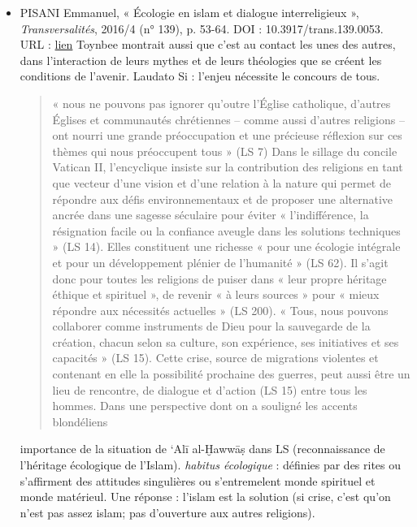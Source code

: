 \begin{itemize}
    \item PISANI Emmanuel, « Écologie en islam et dialogue interreligieux », \textit{Transversalités}, 2016/4 (n° 139), p. 53-64. DOI : 10.3917/trans.139.0053. URL : \href{https://www-cairn-info.icp.idm.oclc.org/revue-transversalites-2016-4-page-53.htm }{lien}
    Toynbee montrait aussi que c’est au contact les unes des autres, dans l’interaction de leurs mythes et de leurs théologies que se créent les conditions de l’avenir.
    Laudato Si : l'enjeu nécessite le concours de tous.
    \begin{quote}
        « nous ne pouvons pas ignorer qu’outre l’Église catholique, d’autres Églises et communautés chrétiennes – comme aussi d’autres religions – ont nourri une grande préoccupation et une précieuse réflexion sur ces thèmes qui nous préoccupent tous » (LS 7)
        Dans le sillage du concile Vatican II, l’encyclique insiste sur la contribution des religions en tant que vecteur d’une vision et d’une relation à la nature qui permet de répondre aux défis environnementaux et de proposer une alternative ancrée dans une sagesse séculaire pour éviter « l’indifférence, la résignation facile ou la confiance aveugle dans les solutions techniques » (LS 14). Elles constituent une richesse « pour une écologie intégrale et pour un développement plénier de l’humanité » (LS 62). Il s’agit donc pour toutes les religions de puiser dans « leur propre héritage éthique et spirituel », de revenir « à leurs sources » pour « mieux répondre aux nécessités actuelles » (LS 200). « Tous, nous pouvons collaborer comme instruments de Dieu pour la sauvegarde de la création, chacun selon sa culture, son expérience, ses initiatives et ses capacités » (LS 15). Cette crise, source de migrations violentes et contenant en elle la possibilité prochaine des guerres, peut aussi être un lieu de rencontre, de dialogue et d’action (LS 15) entre tous les hommes. Dans une perspective dont on a souligné les accents blondéliens 

    \end{quote}
    importance de la situation de ‘Alī al-Ḫawwāṣ dans LS (reconnaissance de l'héritage écologique de l'Islam).     
    \textit{habitus écologique} : définies par des rites ou s'affirment des attitudes singulières ou s'entremelent monde spirituel et monde matérieul. 
    Une réponse : l’islam est la solution (si crise, c'est qu'on n'est pas assez islam; pas d'ouverture aux autres religions).
    

\end{itemize}
